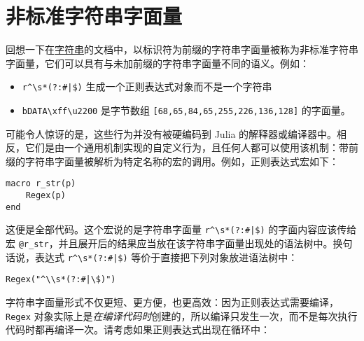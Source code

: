 \hypertarget{7550171062631975520}{}


\section{非标准字符串字面量}



回想一下在\href{@ref non-standard-string-literals}{字符串}的文档中，以标识符为前缀的字符串字面量被称为非标准字符串字面量，它们可以具有与未加前缀的字符串字面量不同的语义。例如：



\begin{itemize}
\item \texttt{r{\textquotedbl}{\textasciicircum}{\textbackslash}s*(?:\#|\$){\textquotedbl}} 生成一个正则表达式对象而不是一个字符串


\item \texttt{b{\textquotedbl}DATA{\textbackslash}xff{\textbackslash}u2200{\textquotedbl}} 是字节数组 \texttt{[68,65,84,65,255,226,136,128]} 的字面量。

\end{itemize}


可能令人惊讶的是，这些行为并没有被硬编码到 Julia 的解释器或编译器中。相反，它们是由一个通用机制实现的自定义行为，且任何人都可以使用该机制：带前缀的字符串字面量被解析为特定名称的宏的调用。例如，正则表达式宏如下：




\begin{verbatim}
macro r_str(p)
    Regex(p)
end
\end{verbatim}



这便是全部代码。这个宏说的是字符串字面量 \texttt{r{\textquotedbl}{\textasciicircum}{\textbackslash}s*(?:\#|\$){\textquotedbl}} 的字面内容应该传给宏 \texttt{@r\_str}，并且展开后的结果应当放在该字符串字面量出现处的语法树中。换句话说，表达式 \texttt{r{\textquotedbl}{\textasciicircum}{\textbackslash}s*(?:\#|\$){\textquotedbl}} 等价于直接把下列对象放进语法树中：




\begin{verbatim}
Regex("^\\s*(?:#|\$)")
\end{verbatim}



字符串字面量形式不仅更短、更方便，也更高效：因为正则表达式需要编译，\texttt{Regex} 对象实际上是\emph{在编译代码时}创建的，所以编译只发生一次，而不是每次执行代码时都再编译一次。请考虑如果正则表达式出现在循环中：




